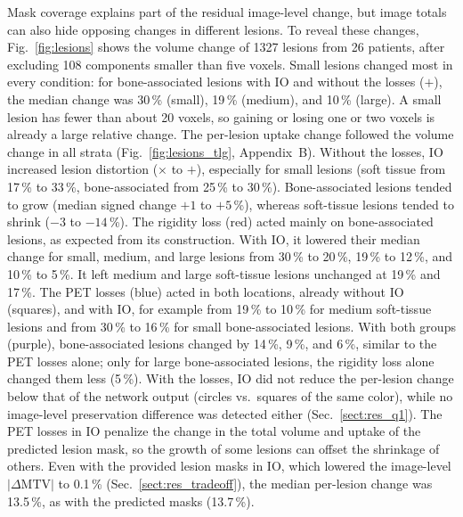Mask coverage explains part of the residual image-level change, but image totals can also hide opposing changes in different lesions.
To reveal these changes, Fig.~\ref{fig:lesions} shows the volume change of 1327 lesions from 26 patients, after excluding 108 components smaller than five voxels.
Small lesions changed most in every condition: for bone-associated lesions with IO and without the losses ($+$), the median change was 30\,\% (small), 19\,\% (medium), and 10\,\% (large).
A small lesion has fewer than about 20 voxels, so gaining or losing one or two voxels is already a large relative change.
The per-lesion uptake change followed the volume change in all strata (Fig.~\ref{fig:lesions_tlg}, Appendix~B).
Without the losses, IO increased lesion distortion ($\times$ to $+$), especially for small lesions (soft tissue from 17\,\% to 33\,\%, bone-associated from 25\,\% to 30\,\%).
Bone-associated lesions tended to grow (median signed change $+1$ to $+5$\,\%), whereas soft-tissue lesions tended to shrink ($-3$ to $-14$\,\%).
The rigidity loss (red) acted mainly on bone-associated lesions, as expected from its construction.
With IO, it lowered their median change for small, medium, and large lesions from 30\,\% to 20\,\%, 19\,\% to 12\,\%, and 10\,\% to 5\,\%.
It left medium and large soft-tissue lesions unchanged at 19\,\% and 17\,\%.
The PET losses (blue) acted in both locations, already without IO (squares), and with IO, for example from 19\,\% to 10\,\% for medium soft-tissue lesions and from 30\,\% to 16\,\% for small bone-associated lesions.
With both groups (purple), bone-associated lesions changed by 14\,\%, 9\,\%, and 6\,\%, similar to the PET losses alone; only for large bone-associated lesions, the rigidity loss alone changed them less (5\,\%).
With the losses, IO did not reduce the per-lesion change below that of the network output (circles vs.\ squares of the same color), while no image-level preservation difference was detected either (Sec.~\ref{sect:res_q1}).
The PET losses in IO penalize the change in the total volume and uptake of the predicted lesion mask, so the growth of some lesions can offset the shrinkage of others.
Even with the provided lesion masks in IO, which lowered the image-level $|\Delta\mathrm{MTV}|$ to 0.1\,\% (Sec.~\ref{sect:res_tradeoff}), the median per-lesion change was 13.5\,\%, as with the predicted masks (13.7\,\%).

